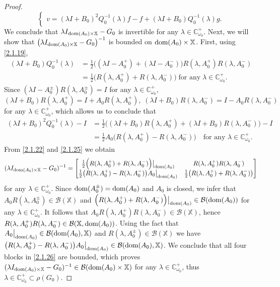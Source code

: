 \documentclass[11pt]{amsart}
\numberwithin{equation}{section}
\newcommand{\CC}{{\mathbb C}}
\theoremstyle{remark}
\theoremstyle{definition}
\newcommand\bX{{\mathbb X}}
\newcommand{\dom}{\text{\rm{dom}}}
\begin{document}
\begin{proof}
\begin{equation}
\begin{cases}
			v=(\lambda I+B_0)^2Q_0^{-1}(\lambda)f-f+(\lambda I+B_0)Q_0^{-1}(\lambda)g.
		\end{cases}
	\end{equation}
	We conclude that $\lambda I_{\dom(A_0)\times \bX}-G_0$ is invertible for any $\lambda\in\mathbb{C}_{\omega_0}^+$. Next, we will show that $\big(\lambda I_{\dom(A_0)\times \bX}-G_0\big)^{-1}$ is bounded on $\dom(A_0)\times\bX$. First, using \eqref{2.1.19},
	\begin{align}\label{2.1.23}
		(\lambda I+B_0)Q_0^{-1}(\lambda)&=\tfrac{1}{2}\Big((\lambda I-A_0^+)+(\lambda I-A_0^-)\Big)R(\lambda,A_0^+)R(\lambda,A_0^-)\nonumber\\
		&=\tfrac{1}{2}\Big(R(\lambda,A_0^+)+R(\lambda,A_0^-)\Big)\;\mbox{for any}\;\lambda\in\CC_{\omega_0}^+.
	\end{align}	
	Since $(\lambda I-A_0^\pm)R(\lambda,A_0^\pm)=I$ for any $\lambda\in\CC_{\omega_0}^+$, 
	\begin{equation}\label{2.1.24}
		(\lambda I+B_0)R(\lambda,A_0^+)=I+A_0 R(\lambda,A_0^+),\;(\lambda I+B_0)R(\lambda,A_0^-)=I-A_0 R(\lambda,A_0^-)
	\end{equation}
	for any $\lambda\in\CC_{\omega_0}^+$, which allows us to conclude that 
	\begin{align}\label{2.1.25}
		(\lambda I+B_0)^2Q_0^{-1}(\lambda)-I&=\tfrac{1}{2}\Big((\lambda I+B_0)R(\lambda,A_0^+)+(\lambda I+B_0)R(\lambda,A_0^-)\Big)-I\nonumber\\
		&= \tfrac{1}{2}A_0\Big( R(\lambda,A_0^+)-R(\lambda,A_0^-)\Big)\quad\text{for any }\lambda\in\mathbb{C}_{\omega_0}^+.
	\end{align}
	From \eqref{2.1.22} and \eqref{2.1.25} we obtain 
	\begin{equation}\label{2.1.26}
		(\lambda I_{\dom(A_0)\times\bX}-G_0)^{-1}
		=\begin{bmatrix}
			\tfrac{1}{2}\Big(R(\lambda,A_0^+)+R(\lambda,A_0^-)\Big)\big|_{\dom(A_0)} &
			R(\lambda,A_0^+)R(\lambda,A_0^-)\\
			\tfrac{1}{2}\big(R(\lambda,A_0^+)-R(\lambda,A_0^-)\big)A_0\big|_{\dom(A_0)} &
			\tfrac{1}{2}\big(R(\lambda,A_0^+)+R(\lambda,A_0^-)\big)
		\end{bmatrix}
	\end{equation}
	for any $\lambda\in\CC_{\omega_0}^+$. Since $\dom(A_0^\pm)=\dom(A_0)$ and $A_0$ is closed, we infer that
	$A_0 R(\lambda,A_0^\pm)\in\mathcal{B}(\bX)$ and $\Big(R(\lambda,A_0^+)+R(\lambda,A_0^-)\Big)\big|_{\dom(A_0)}\in\mathcal{B}(\dom(A_0))$ for any $\lambda\in\CC_{\omega_0}^+$. It follows that $A_0R(\lambda,A_0^+)R(\lambda,A_0^-)\in\mathcal{B}(\bX)$, hence $R(\lambda,A_0^+)R(\lambda,A_0^-)\in\mathcal{B}(\bX,\dom(A_0))$. Using the fact that $A_0\big|_{\dom(A_0)}\in\mathcal{B}(\dom(A_0),\bX)$ and $R(\lambda,A_0^\pm)\in\mathcal{B}(\bX)$ we have $\big(R(\lambda,A_0^+)-R(\lambda,A_0^-)\big)A_0\big|_{\dom(A_0)}\in\mathcal{B}(\dom(A_0),\bX)$. We conclude that all four blocks in \eqref{2.1.26} are bounded, which proves 
	$(\lambda I_{\dom(A_0)\times \bX}-G_0)^{-1}\in\mathcal{B}(\dom(A_0)\times \bX)$ for any $\lambda\in\CC_{\omega_0}^+$, thus $\lambda\in\CC_{\omega_0}^+\subset\rho(G_0)$.
	

\end{proof}
\end{document}

